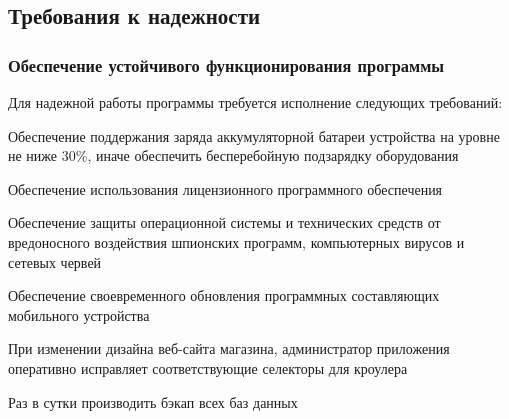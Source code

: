 \subsection{Требования к надежности}
\subsubsection{Обеспечение устойчивого функционирования программы}

Для надежной работы программы требуется исполнение следующих требований:
\begin{my_enumerate}
\item Обеспечение поддержания заряда аккумуляторной батареи устройства на
уровне не ниже 30\%, иначе обеспечить бесперебойную подзарядку оборудования
\item Обеспечение использования лицензионного программного обеспечения
\item Обеспечение защиты операционной системы и технических средств от
вредоносного воздействия шпионских программ, компьютерных вирусов и сетевых
червей
\item Обеспечение своевременного обновления программных составляющих мобильного устройства
\item При изменении дизайна веб-сайта магазина, администратор приложения оперативно
исправляет соответствующие селекторы для кроулера
\item Раз в сутки производить бэкап всех баз данных
\end{my_enumerate}
